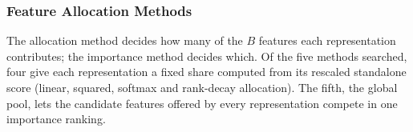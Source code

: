 \subsubsection{Feature Allocation Methods}\label{sec:method:allocation}


The allocation method decides how many of the $B$ features each representation contributes; the importance method decides which. Of the five methods searched, four give each representation a fixed share computed from its rescaled standalone score (linear, squared, softmax and rank-decay allocation). The fifth, the global pool, lets the candidate features offered by every representation compete in one importance ranking.






